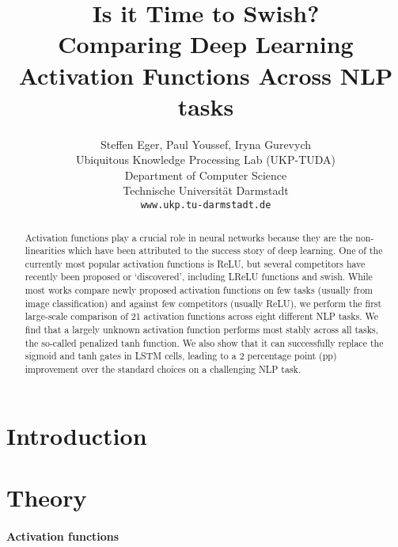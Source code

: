 \documentclass[11pt,a4paper]{article}
\title{Is it Time to Swish? \\ Comparing Deep Learning Activation Functions Across NLP tasks}
\author{Steffen Eger, Paul Youssef, Iryna Gurevych \\
  Ubiquitous Knowledge Processing Lab (UKP-TUDA) \\
  Department of Computer Science \\
  Technische Universit\"at Darmstadt\\
  {\tt www.ukp.tu-darmstadt.de}
  }
\date{}
\newcommand{\swish}{\textsf{swish}}
\newcommand{\pentan}{\textsf{penalized tanh}}
\newcommand{\mytanh}{\textsf{tanh}}
\newcommand{\sigmoid}{\textsf{sigmoid}}
\begin{document}
\maketitle
\begin{abstract}
Activation functions play a crucial role in neural networks because they are the non-linearities which have been attributed to the success story of deep learning. One of the currently most popular activation functions is ReLU, but several competitors have recently been proposed or `discovered', including LReLU functions and \swish. While most works compare newly proposed activation functions on few tasks (usually from image classification) and against few competitors (usually ReLU), we perform the first large-scale comparison of 21 activation functions across eight different NLP tasks. We find that a largely unknown activation function performs most stably across all tasks, the so-called \pentan{} function. We also show that it can successfully replace the \sigmoid{} and \mytanh{} gates in LSTM cells, leading to a 2 percentage point (pp) improvement over the standard choices on a challenging NLP task.
\end{abstract}

\section{Introduction}

\section{Theory}

\paragraph{Activation functions}
\end{document}
